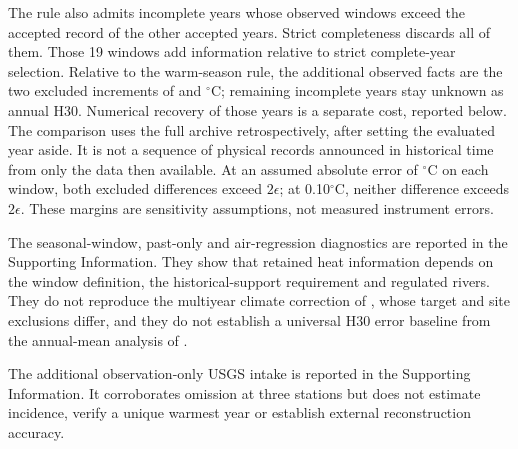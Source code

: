 \documentclass[draft,linenumbers]{agujournal2025}
\begin{document}
The rule also admits \CCWarmAdmittedNewFacts{} incomplete years whose observed windows exceed the accepted record of the other accepted years. Strict completeness discards all of them. Those 19 windows add information relative to strict complete-year selection. Relative to the warm-season rule, the additional observed facts are the two excluded increments of \CCWarmIncrementOne{} and \CCWarmIncrementTwo{}$^{\circ}$C; remaining incomplete years stay unknown as annual H30. Numerical recovery of those years is a separate cost, reported below. The comparison uses the full archive retrospectively, after setting the evaluated year aside. It is not a sequence of physical records announced in historical time from only the data then available. At an assumed absolute error of \CCMarginHalfWidth{}$^{\circ}$C on each window, both excluded differences exceed $2\epsilon$; at 0.10$^{\circ}$C, neither difference exceeds $2\epsilon$. These margins are sensitivity assumptions, not measured instrument errors.



The seasonal-window, past-only and air-regression diagnostics are reported in the Supporting Information. They show that retained heat information depends on the window definition, the historical-support requirement and regulated rivers. They do not reproduce the multiyear climate correction of , whose target and site exclusions differ, and they do not establish a universal H30 error baseline from the annual-mean analysis of .

The additional observation-only USGS intake is reported in the Supporting Information. It corroborates omission at three stations but does not estimate incidence, verify a unique warmest year or establish external reconstruction accuracy.
\end{document}
